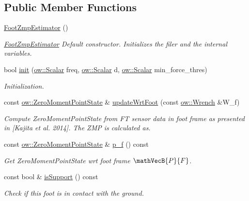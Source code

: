 \subsection*{Public Member Functions}
\begin{DoxyCompactItemize}
\item 
\hyperlink{classow__zmp_1_1FootZmpEstimator_a7d4972b9f58c9d322d1fe9169bae0996}{Foot\+Zmp\+Estimator} ()\hypertarget{classow__zmp_1_1FootZmpEstimator_a7d4972b9f58c9d322d1fe9169bae0996}{}\label{classow__zmp_1_1FootZmpEstimator_a7d4972b9f58c9d322d1fe9169bae0996}

\begin{DoxyCompactList}\small\item\em \hyperlink{classow__zmp_1_1FootZmpEstimator}{Foot\+Zmp\+Estimator} Default constructor. Initializes the filer and the internal variables. \end{DoxyCompactList}\item 
bool \hyperlink{classow__zmp_1_1FootZmpEstimator_add7eda713cecb592d6f4ab5e549458a0}{init} (\hyperlink{types_8h_ac412879ee4a239c8032aa2d647f4a74a}{ow\+::\+Scalar} freq, \hyperlink{types_8h_ac412879ee4a239c8032aa2d647f4a74a}{ow\+::\+Scalar} d, \hyperlink{types_8h_ac412879ee4a239c8032aa2d647f4a74a}{ow\+::\+Scalar} min\+\_\+force\+\_\+thres)
\begin{DoxyCompactList}\small\item\em Initialization. \end{DoxyCompactList}\item 
const \hyperlink{classow__core_1_1ZeroMomentPointState}{ow\+::\+Zero\+Moment\+Point\+State} \& \hyperlink{classow__zmp_1_1FootZmpEstimator_a73485cd951c6dd68b52cb5750d25a196}{update\+Wrt\+Foot} (const \hyperlink{classow__core_1_1Wrench}{ow\+::\+Wrench} \&W\+\_\+f)
\begin{DoxyCompactList}\small\item\em Compute Zero\+Moment\+Point\+State from FT sensor data in foot frame as presented in \mbox{[}Kajita et al. 2014\mbox{]}. The Z\+MP is calculated as. \end{DoxyCompactList}\item 
const \hyperlink{classow__core_1_1ZeroMomentPointState}{ow\+::\+Zero\+Moment\+Point\+State} \& \hyperlink{classow__zmp_1_1FootZmpEstimator_af913ff44ac3a5133bae6cb141c336b91}{p\+\_\+f} () const 
\begin{DoxyCompactList}\small\item\em Get Zero\+Moment\+Point\+State wrt foot frame $ \mathVecB{P}{F} $. \end{DoxyCompactList}\item 
const bool \& \hyperlink{classow__zmp_1_1FootZmpEstimator_acf5d50ae805796ebc44ec23d6fdef7b2}{is\+Support} () const 
\begin{DoxyCompactList}\small\item\em Check if this foot is in contact with the ground. \end{DoxyCompactList}\end{DoxyCompactItemize}
